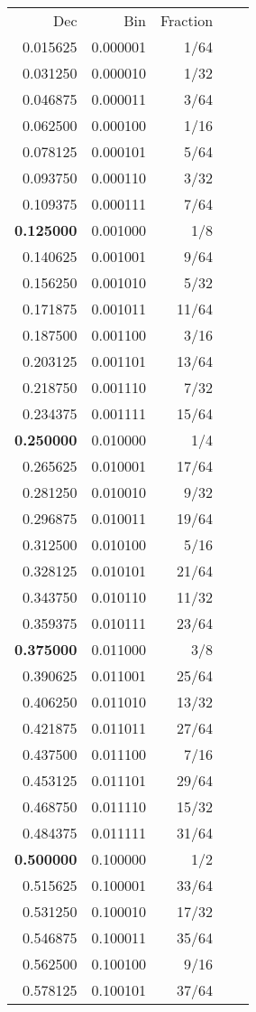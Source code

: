\documentclass[a4paper]{article}
\begin{document}
\begin{tabular}{| r | r | r | r | r |}

Dec & Bin & Fraction \\
0.015625&0.000001&1/64\\
0.031250&0.000010&1/32\\
0.046875&0.000011&3/64\\
0.062500&0.000100&1/16\\
0.078125&0.000101&5/64\\
0.093750&0.000110&3/32\\
0.109375&0.000111&7/64\\
\textbf{0.125000}&0.001000&1/8\\
0.140625&0.001001&9/64\\
0.156250&0.001010&5/32\\
0.171875&0.001011&11/64\\
0.187500&0.001100&3/16\\
0.203125&0.001101&13/64\\
0.218750&0.001110&7/32\\
0.234375&0.001111&15/64\\
\textbf{0.250000}&0.010000&1/4\\
0.265625&0.010001&17/64\\
0.281250&0.010010&9/32\\
0.296875&0.010011&19/64\\
0.312500&0.010100&5/16\\
0.328125&0.010101&21/64\\
0.343750&0.010110&11/32\\
0.359375&0.010111&23/64\\
\textbf{0.375000}&0.011000&3/8\\
0.390625&0.011001&25/64\\
0.406250&0.011010&13/32\\
0.421875&0.011011&27/64\\
0.437500&0.011100&7/16\\
0.453125&0.011101&29/64\\
0.468750&0.011110&15/32\\
0.484375&0.011111&31/64\\
\textbf{0.500000}&0.100000&1/2\\
0.515625&0.100001&33/64\\
0.531250&0.100010&17/32\\
0.546875&0.100011&35/64\\
0.562500&0.100100&9/16\\
0.578125&0.100101&37/64\\

\end{tabular}
\end{document}
